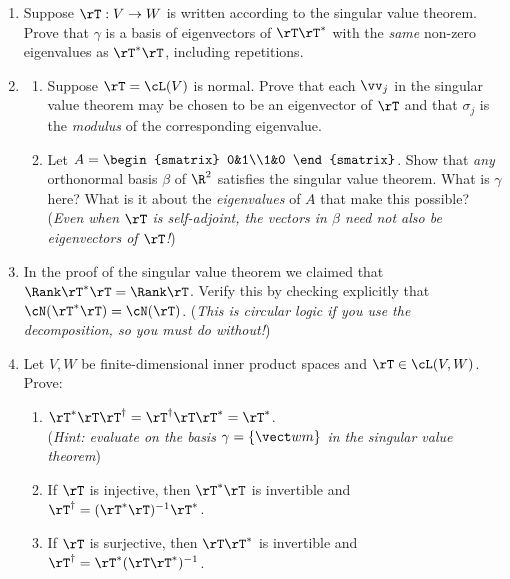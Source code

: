 \begin{exercises}
\begin{enumerate}
  \item Suppose $\rT:V\to W$ is written according to the singular value theorem. Prove that $\gamma$ is a basis of eigenvectors of $\rT\rT^*$ with the \emph{same} non-zero eigenvalues as $\rT^*\rT$, including repetitions.
  
  \item\label{exs:specsingular}\begin{enumerate}
    \item Suppose $\rT=\cL(V)$ is normal. Prove that each $\vv_j$ in the singular value theorem may be chosen to be an eigenvector of $\rT$ and that $\sigma_j$ is the \emph{modulus} of the corresponding eigenvalue.
    \item Let $A=\begin{smatrix}
    0&1\\1&0
    \end{smatrix}$. Show that \emph{any} orthonormal basis $\beta$ of $\R^2$ satisfies the singular value theorem. What is $\gamma$ here? What is it about the \emph{eigenvalues} of $A$ that make this possible?\smallbreak
    (\emph{Even when $\rT$ is self-adjoint, the vectors in $\beta$ need not also be eigenvectors of $\rT$!})
  \end{enumerate}
  
  \item\label{exs:ranktstart} In the proof of the singular value theorem we claimed that $\Rank \rT^*\rT=\Rank\rT$. Verify this by checking explicitly that $\cN(\rT^*\rT)=\cN(\rT)$.\smallbreak
  (\emph{This is circular logic if you use the decomposition, so you must do without!})
  

  
 
  \item Let $V,W$ be finite-dimensional inner product spaces and $\rT\in\cL(V,W)$. Prove:
  \begin{enumerate}
    \item $\rT^*\rT\rT^\dag=\rT^\dag\rT\rT^*=\rT^*$.\\
    (\emph{Hint: evaluate on the basis $\gamma=\{\vect wm\}$ in the singular value theorem})
    \item If $\rT$ is injective, then $\rT^*\rT$ is invertible and $\rT^\dag=(\rT^*\rT)^{-1}\rT^*$.
    \item If $\rT$ is surjective, then $\rT\rT^*$ is invertible and $\rT^\dag=\rT^*(\rT\rT^*)^{-1}$.
  \end{enumerate}
  

\end{enumerate}
\end{exercises}

